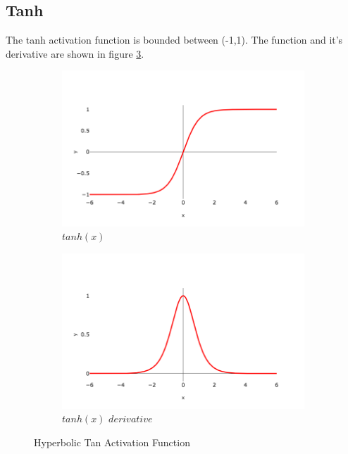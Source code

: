         \subsection{Tanh}
            The tanh activation function is bounded between (-1,1). The function and it's derivative are shown in figure \ref{fig:tanh}. 
            \begin{figure}[H]
                \begin{subfigure}{0.5\textwidth}
                  \centering
                  \includegraphics[width=1.0\linewidth]{Images/tanh.png}
                  \caption{$tanh(x)$}
                  \label{fig:tanh}
                \end{subfigure}%
                \begin{subfigure}{0.5\textwidth}
                  \centering
                  \includegraphics[width=1.0\linewidth]{Images/dtanh.png}
                  \caption{$tanh(x) \, \, derivative$}
                  \label{fig:tanh_div}
                \end{subfigure}
                \caption{Hyperbolic Tan Activation Function}
                \label{fig:tanh}
            \end{figure}

